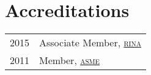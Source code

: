 \section*{Accreditations} %
\label{sec:ce}

\begin{tabular}{l l}
  2015 & Associate Member, \href{https://rina.org.uk}{\textsc{rina}} \\
  2011 & Member, \href{https://www.asme.org}{\textsc{asme}} \\
\end{tabular}

